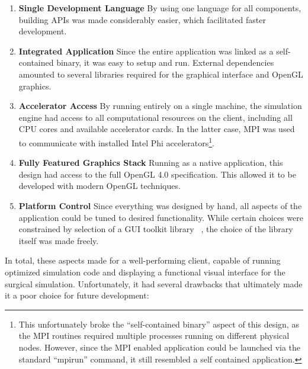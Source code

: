 \begin{enumerate}
  \item \textbf{Single Development Language} By using one language for
    all components, building APIs was made considerably easier, which
    facilitated faster development.

  \item \textbf{Integrated Application} Since the entire application
    was linked as a self-contained binary, it was easy to setup and
    run. External dependencies amounted to several libraries required
    for the graphical interface and OpenGL graphics.

  \item \textbf{Accelerator Access} By running entirely on a single
    machine, the simulation engine had access to all computational
    resources on the client, including all CPU cores and available
    accelerator cards. In the latter case, MPI was used to communicate
    with installed Intel Phi accelerators\footnote{This unfortunately
      broke the ``self-contained binary'' aspect of this design, as
      the MPI routines required multiple processes running on
      different physical nodes. However, since the MPI enabled
      application could be launched via the standard ``mpirun'' command, it
      still resembled a self contained application.}. 

   \item \textbf{Fully Featured Graphics Stack} Running as a native
     application, this design had access to the full OpenGL 4.0
     specification. This allowed it to be developed with modern OpenGL
     techniques.

   \item \textbf{Platform Control} Since everything was designed by
     hand, all aspects of the application could be tuned to desired
     functionality. While certain choices were constrained by
     selection of a GUI toolkit library ~\citep{wxWid:2017}, the choice of the
     library itself was made freely.
    
\end{enumerate}

 In total, these aspects made for a well-performing client, capable of
 running optimized simulation code and displaying a functional visual
 interface for the surgical simulation. Unfortunately, it had several
 drawbacks that ultimately made it a poor choice for future
 development:

